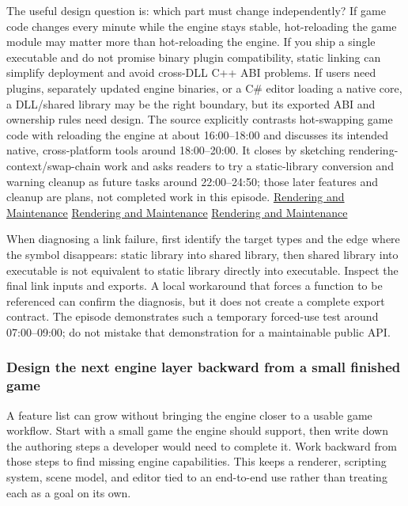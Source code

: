 The useful design question is: which part must change independently? If game code changes every minute while the engine stays stable, hot-reloading the game module may matter more than hot-reloading the engine. If you ship a single executable and do not promise binary plugin compatibility, static linking can simplify deployment and avoid cross-DLL C++ ABI problems. If users need plugins, separately updated engine binaries, or a C\# editor loading a native core, a DLL/shared library may be the right boundary, but its exported ABI and ownership rules need design. The source explicitly contrasts hot-swapping game code with reloading the engine at about 16:00--18:00 and discusses its intended native, cross-platform tools around 18:00--20:00. It closes by sketching rendering-context/swap-chain work and asks readers to try a static-library conversion and warning cleanup as future tasks around 22:00--24:50; those later features and cleanup are plans, not completed work in this episode. \href{https://www.youtube.com/watch?v=695SyEyFwWU&t=960s}{Rendering and Maintenance} \href{https://www.youtube.com/watch?v=695SyEyFwWU&t=1080s}{Rendering and Maintenance} \href{https://www.youtube.com/watch?v=695SyEyFwWU&t=1320s}{Rendering and Maintenance}

When diagnosing a link failure, first identify the target types and the edge where the symbol disappears: static library into shared library, then shared library into executable is not equivalent to static library directly into executable. Inspect the final link inputs and exports. A local workaround that forces a function to be referenced can confirm the diagnosis, but it does not create a complete export contract. The episode demonstrates such a temporary forced-use test around 07:00--09:00; do not mistake that demonstration for a maintainable public API.

\subsubsection{Design the next engine layer backward from a small finished game}\label{design-the-next-engine-layer-backward-from-a-small-finished-game}

A feature list can grow without bringing the engine closer to a usable game workflow. Start with a small game the engine should support, then write down the authoring steps a developer would need to complete it. Work backward from those steps to find missing engine capabilities. This keeps a renderer, scripting system, scene model, and editor tied to an end-to-end use rather than treating each as a goal on its own.

